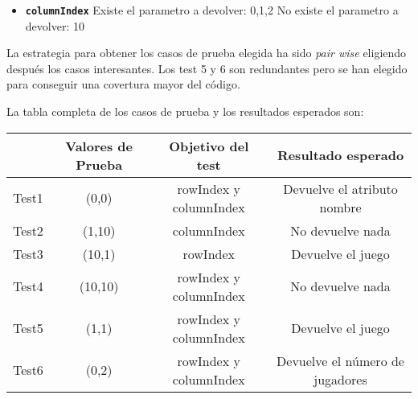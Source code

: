 \begin{itemize}
\item \textbf{\texttt{columnIndex}}
\subitem Existe el parametro a devolver: 0,1,2
\subitem No existe el parametro a devolver: 10
\end{itemize}

La estrategia para obtener los casos de prueba elegida ha sido
\textit{pair wise} eligiendo despu\'es los casos interesantes. Los test 5 y 6 son redundantes pero se han elegido
para conseguir una covertura mayor del c\'odigo.

La tabla completa de los casos de prueba y los resultados esperados son:

{\footnotesize
\begin{longtable}[c]{lccc}
 & \textbf{Valores de Prueba} & \textbf{Objetivo del test} & \textbf{Resultado esperado} \\
\hline \hline
\endhead

Test1 & (0,0) & rowIndex y columnIndex & Devuelve el atributo nombre\\
Test2 & (1,10) & columnIndex & No devuelve nada\\
Test3 & (10,1) & rowIndex & Devuelve el juego\\
Test4 & (10,10) & rowIndex y columnIndex & No devuelve nada\\
Test5 & (1,1) & rowIndex y columnIndex & Devuelve el juego\\
Test6 & (0,2) & rowIndex y columnIndex & Devuelve el n\'umero de jugadores\\

\hline
\end{longtable}
}